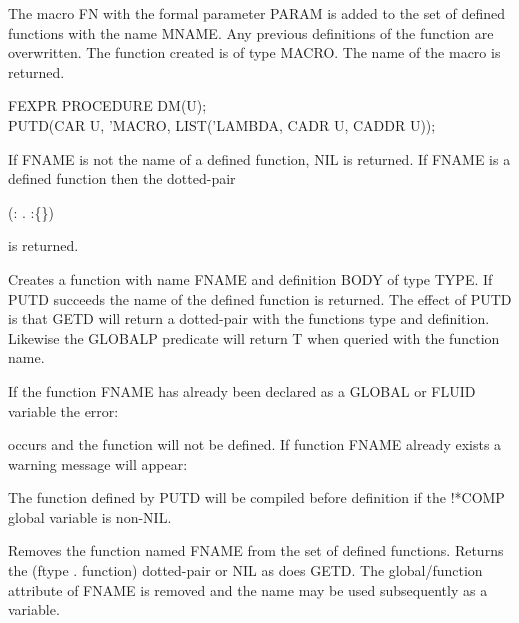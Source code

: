 \documentclass[11pt,letterpaper]{book}
\begin{document}
{The macro FN with the formal parameter PARAM is added to the set of
defined functions with the name MNAME. Any previous definitions of the
function are overwritten. The function created is of type MACRO.
The name of the macro is returned.

{\tt \begin{tabbing} FEXPR PROCEDURE DM(U); \\
\hspace*{1em} PUTD(CAR U, 'MACRO, LIST('LAMBDA, CADR U, CADDR U));
\end{tabbing} }
}


{If FNAME is not the name of a defined function, NIL is returned. If
FNAME is a defined function then the dotted-pair

\vspace{.15in}
(: . :\{\})
\vspace{.15in}

is returned.}


{Creates a function with name FNAME and definition BODY of type TYPE.
If PUTD succeeds the name of the defined function is returned. The
effect of PUTD is that GETD will return a dotted-pair with the
functions type and definition. Likewise the GLOBALP predicate will
 
return T when queried with the function name.

If the function FNAME has already been declared as a GLOBAL or FLUID
variable the error:


occurs and the function will not be defined. If function FNAME already
exists a warning message will appear:


The function defined by PUTD will be compiled before definition
 if the !*COMP global variable is non-NIL.}


{Removes the function named FNAME from the set of defined functions.
Returns the (ftype . function) dotted-pair or NIL as does GETD. The
global/function attribute of FNAME is removed and the name may be used
subsequently as a variable.}
\end{document}

